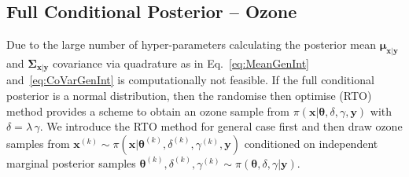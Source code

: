 \subsection{Full Conditional Posterior -- Ozone}
Due to the large number of hyper-parameters calculating the posterior mean $\bm{\mu}_{\bm{x}|\bm{y}}$ and $\bm{\Sigma}_{\bm{x}|\bm{y}}$ covariance via quadrature as in Eq.~\ref{eq:MeanGenInt} and~\ref{eq:CoVarGenInt} is computationally not feasible.
If the full conditional posterior is a normal distribution, then the randomise then optimise (RTO) method provides a scheme to obtain an ozone sample from $\pi(\bm{x}|\bm{\theta}, \delta, \gamma, \bm{y})$ with $\delta = \lambda \, \gamma$.
We introduce the RTO method for general case first and then draw ozone samples from $\bm{x}^{(k)} \sim \pi(\bm{x}|\bm{\theta}^{(k)} , \delta^{(k)} , \gamma^{(k)} , \bm{y})$ conditioned on independent marginal posterior samples $\bm{\theta}^{(k)} , \delta^{(k)} , \gamma^{(k)} \sim \pi(\bm{\theta} , \delta , \gamma | \bm{y})$.


